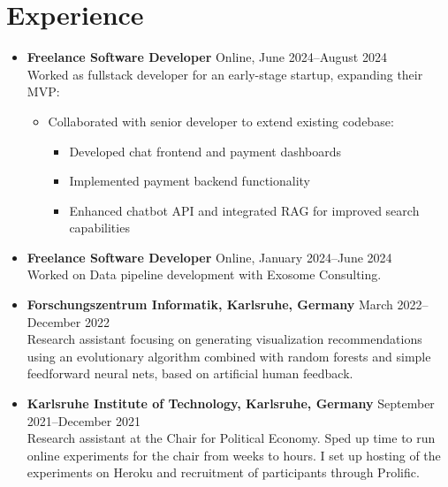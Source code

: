 \documentclass[letterpaper,9pt]{article}
\begin{document}
\section*{Experience}
\begin{itemize}
    \item \textbf{Freelance Software Developer} \hfill Online, June 2024--August 2024 \\
        Worked as fullstack developer for an early-stage startup, expanding their MVP:
        \begin{itemize}
            \item Collaborated with senior developer to extend existing codebase:
			\begin{itemize}
				\item Developed chat frontend and payment dashboards
				\item Implemented payment backend functionality
				\item Enhanced chatbot API and integrated RAG for improved search capabilities
			\end{itemize}
        \end{itemize}
    \item \textbf{Freelance Software Developer} \hfill Online, January 2024--June 2024 \\
        Worked on Data pipeline development with Exosome Consulting.
    \item \textbf{Forschungszentrum Informatik, Karlsruhe, Germany} \hfill March 2022--December 2022 \\
          Research assistant focusing on generating visualization recommendations using an
          evolutionary algorithm combined with random forests and simple feedforward neural nets,
          based on artificial human feedback.
    \item \textbf{Karlsruhe Institute of Technology, Karlsruhe, Germany} \hfill September 2021--December 2021 \\
          Research assistant at the Chair for Political Economy. Sped up time to run online experiments for the chair from
          weeks to hours. I set up hosting of the experiments on Heroku and recruitment of participants through Prolific.
\end{itemize}
\end{document}
